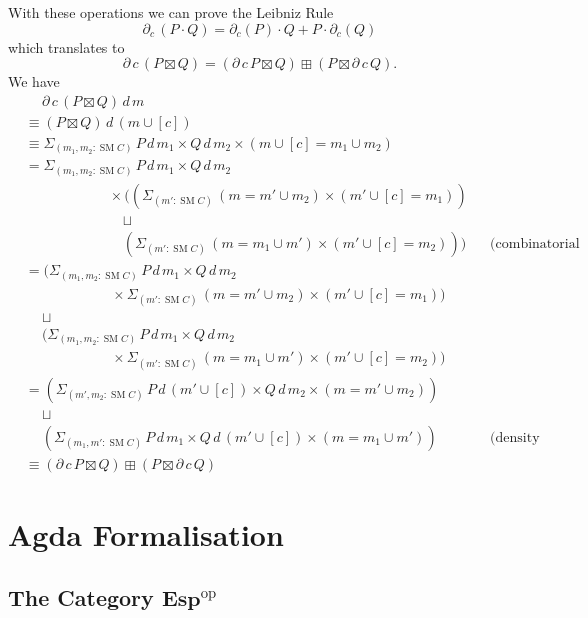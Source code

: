 \documentclass[12pt, parskip, DIV=14]{scrbook}
\newcommand{\SM}{\operatorname{SM}}
\newcommand{\Esp}{\mathbf{Esp}}
\newcommand{\op}[1]{#1^\mathrm{op}}
\begin{document}
With these operations we can prove the Leibniz Rule
$$\partial_c\,(P \cdot Q) = \partial_c(P) \cdot Q + P \cdot \partial_c(Q)$$
which translates to
$$\partial\,c\,(P \boxtimes Q) = (\partial\,c\,P \boxtimes Q) \boxplus (P \boxtimes \partial\,c\,Q).$$
We have
\begin{align*}
  &\quad\ \partial\,c\,(P \boxtimes Q)\,d\,m \\
  &\equiv (P \boxtimes Q)\,d\,(m \cup [c]) \\
  &\equiv \Sigma_{(m_1 , m_2 : \SM C)}\,P\,d\,m_1 \times Q\,d\,m_2 \times (m \cup [c] = m_1 \cup m_2) \\
  &= \Sigma_{(m_1 , m_2 : \SM C)}\,P\,d\,m_1 \times Q\,d\,m_2 \\
  &\qquad\qquad\qquad\times ((\Sigma_{(m' : \SM C)}\,(m = m' \cup m_2) \times (m' \cup [c] = m_1)) \\
  &\qquad\qquad\qquad\quad\sqcup \\
  &\qquad\qquad\qquad\quad(\Sigma_{(m' : \SM C)}\,(m = m_1 \cup m') \times (m' \cup [c] = m_2))) &&\text{(combinatorial lemma)}\\
  &=(\Sigma_{(m_1 , m_2 : \SM C)}\,P\,d\,m_1 \times Q\,d\,m_2  \\
  &\qquad\qquad\qquad\,\times \Sigma_{(m' : \SM C)}\,(m = m' \cup m_2) \times (m' \cup [c] = m_1)) \\
  &\quad\ \sqcup \\
  &\quad\ (\Sigma_{(m_1 , m_2 : \SM C)}\,P\,d\,m_1 \times Q\,d\,m_2  \\
  &\qquad\qquad\qquad\,\times \Sigma_{(m' : \SM C)}\,(m = m_1 \cup m') \times (m' \cup [c] = m_2)) \\
  &=(\Sigma_{(m' , m_2 : \SM C)}\,P\,d\,(m' \cup [c]) \times Q\,d\,m_2 \times (m = m' \cup m_2)) \\
  &\quad\ \sqcup \\
  &\quad\ (\Sigma_{(m_1 , m' : \SM C)}\,P\,d\,m_1 \times Q\,d\,(m' \cup [c]) \times (m = m_1 \cup m')) &&\text{(density formula twice)} \\
  &\equiv (\partial\,c\,P \boxtimes Q) \boxplus (P \boxtimes \partial\,c\,Q)
\end{align*}

\section{Agda Formalisation}

\subsection{The Category $\op\Esp$}
\end{document}
